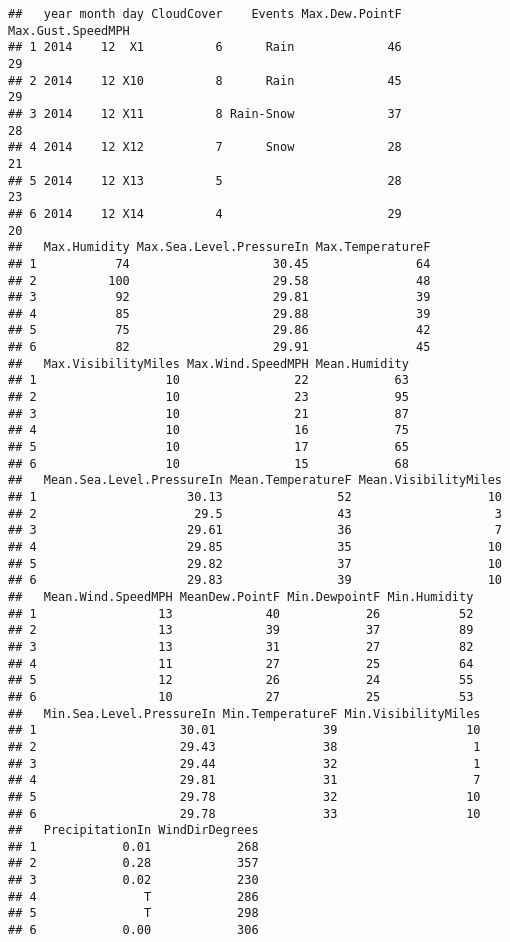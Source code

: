 \documentclass[]{article}
\begin{document}
\begin{verbatim}
##   year month day CloudCover    Events Max.Dew.PointF Max.Gust.SpeedMPH
## 1 2014    12  X1          6      Rain             46                29
## 2 2014    12 X10          8      Rain             45                29
## 3 2014    12 X11          8 Rain-Snow             37                28
## 4 2014    12 X12          7      Snow             28                21
## 5 2014    12 X13          5                       28                23
## 6 2014    12 X14          4                       29                20
##   Max.Humidity Max.Sea.Level.PressureIn Max.TemperatureF
## 1           74                    30.45               64
## 2          100                    29.58               48
## 3           92                    29.81               39
## 4           85                    29.88               39
## 5           75                    29.86               42
## 6           82                    29.91               45
##   Max.VisibilityMiles Max.Wind.SpeedMPH Mean.Humidity
## 1                  10                22            63
## 2                  10                23            95
## 3                  10                21            87
## 4                  10                16            75
## 5                  10                17            65
## 6                  10                15            68
##   Mean.Sea.Level.PressureIn Mean.TemperatureF Mean.VisibilityMiles
## 1                     30.13                52                   10
## 2                      29.5                43                    3
## 3                     29.61                36                    7
## 4                     29.85                35                   10
## 5                     29.82                37                   10
## 6                     29.83                39                   10
##   Mean.Wind.SpeedMPH MeanDew.PointF Min.DewpointF Min.Humidity
## 1                 13             40            26           52
## 2                 13             39            37           89
## 3                 13             31            27           82
## 4                 11             27            25           64
## 5                 12             26            24           55
## 6                 10             27            25           53
##   Min.Sea.Level.PressureIn Min.TemperatureF Min.VisibilityMiles
## 1                    30.01               39                  10
## 2                    29.43               38                   1
## 3                    29.44               32                   1
## 4                    29.81               31                   7
## 5                    29.78               32                  10
## 6                    29.78               33                  10
##   PrecipitationIn WindDirDegrees
## 1            0.01            268
## 2            0.28            357
## 3            0.02            230
## 4               T            286
## 5               T            298
## 6            0.00            306
\end{verbatim}
\end{document}
